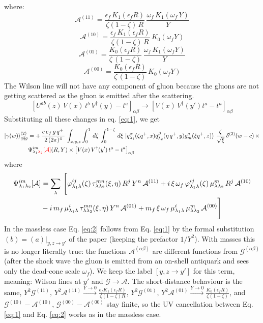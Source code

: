 \documentclass[9pt]{article}
\newcommand{\chg}[1]{{\color{red}#1}}
\numberwithin{equation}{section}
\begin{document}
\begin{enumerate}
where: 
$$\mathcal{A}^{(11)} = \frac{\epsilon_{f}\,K_{1}(\epsilon_{f} R)}{\zeta(1-\zeta)\,R}\,\frac{\omega_{f}\,K_{1}(\omega_{f}\,Y)}{Y}$$
$$\mathcal{A}^{(10)} = \frac{\epsilon_{f}\,K_{1}(\epsilon_{f}R)}{\zeta(1-\zeta)\,R}\, K_{0}(\omega_{f}Y)$$
$$\mathcal{A}^{(01)} = \frac{K_{0}(\epsilon_{f}R)}{\zeta\,(1-\zeta)}\,\frac{\omega_{f}\,K_{1}(\omega_{f}Y)}{Y}$$
$$\mathcal{A}^{(00)} = \frac{K_{0}(\epsilon_{f}R)}{\zeta\,(1-\zeta)}\,K_{0}(\omega_{f}Y)$$
The Wilson line will not have any component of gluon because the gluons are not getting scattered as the gluon is emitted after the scattering. 
$$\left[U^{ab}(z)\,V(x)\,t^{b}\,V^{\dagger}(y)-t^{a}\right]_{\alpha\beta}\rightarrow \left[V(x)\,V^{\dagger}(y')t^{a}-t^{a}\right]_{\alpha\beta} $$
Substituting all these changes in eq. \eqref{eq:1}, we get
\begin{align} \label{eq:2}
     \ket{\gamma(w)}^{(2)}_{q\Bar{q}g} & = +\,\frac{e\,e_{f}\,g\,q^{+}\,}{2\,(2\pi)^{4}}\, \int_{x,y,z} \int_{0}^{1}\, d\zeta\, \int_{0}^{1-\zeta}\, d\xi\,\ket{q^{\alpha}_{\lambda_{1}}(\zeta q^{+},x)\Bar{q}^{\beta}_{\lambda_{2}}(\eta\,q^{+},y)g^{a}_{m}(\xi q^{+},z)}\, \frac{\zeta}{\sqrt{\xi}}\, \delta^{(2)}(w-c)\,\times \notag \\ & \Psi^{im}_{\lambda_{1}\chg{\lambda_{2}}}\chg{[\mathcal{A}]}(R,Y)\times \left[V(x)\,V^{\dagger}(y')\,t^{a}-t^{a}\right]_{\alpha\beta}
\end{align}
where
\begin{align}
  \Psi^{im}_{\lambda_{1}\lambda_{2}}[\mathcal{A}] & = \sum_{\lambda}\, \Bigg[\varphi^{ij}_{\lambda_{1}\lambda}(\zeta)\,\tau^{mn}_{\lambda\lambda_{2}}(\xi,\eta)\,R^{j}\,Y^{n}\,\mathcal{A}^{(11)}+i\,\xi\,\omega_{f}\,\varphi^{ij}_{\lambda_{1}\lambda}(\zeta)\,\mu^{m}_{\lambda\lambda_{2}}\,R^{j}\,\mathcal{A}^{(10)}\notag \\ & -i\,m_{f}\,\mu^{i}_{\lambda_{1}\lambda}\,\tau^{mn}_{\lambda\lambda_{2}}(\xi,\eta)\,Y^{n}\,\mathcal{A}^{(01)} + m_{f}\,\xi\,\omega_{f}\,\mu^{i}_{\lambda_{1}\lambda}\,\mu^{m}_{\lambda\lambda_{2}}\,\mathcal{A}^{(00)}\Bigg]  
\end{align}
\label{chg:ba}\chg{In the massless case Eq. \eqref{eq:2} follows from Eq. \eqref{eq:1} by the formal substitution $(b) = (a)|_{y,z\rightarrow y'}$ of the paper (keeping the prefactor $1/Y^{2}$). With masses this is no longer literally true: the functions $\mathcal{A}^{(\alpha\beta)}$ are different functions from $\mathcal{G}^{(\alpha\beta)}$ (after the shock wave the gluon is emitted from an on-shell antiquark and sees only the dead-cone scale $\omega_{f}$). We keep the label $[y,z\rightarrow y']$ for this term, meaning: Wilson lines at $y'$ and $\mathcal{G}\rightarrow\mathcal{A}$. The short-distance behaviour is the same, $Y^{2}\mathcal{G}^{(11)},\,Y^{2}\mathcal{A}^{(11)}\xrightarrow{Y\rightarrow 0}\frac{\epsilon_{f}K_{1}(\epsilon_{f}R)}{\zeta(1-\zeta)R}$, $Y^{2}\mathcal{G}^{(01)},\,Y^{2}\mathcal{A}^{(01)}\xrightarrow{Y\rightarrow 0}\frac{K_{0}(\epsilon_{f}R)}{\zeta(1-\zeta)}$, and $\mathcal{G}^{(10)}-\mathcal{A}^{(10)}$, $\mathcal{G}^{(00)}-\mathcal{A}^{(00)}$ stay finite, so the UV cancellation between Eq. \eqref{eq:1} and Eq. \eqref{eq:2} works as in the massless case.}

\end{enumerate}
\end{document}
